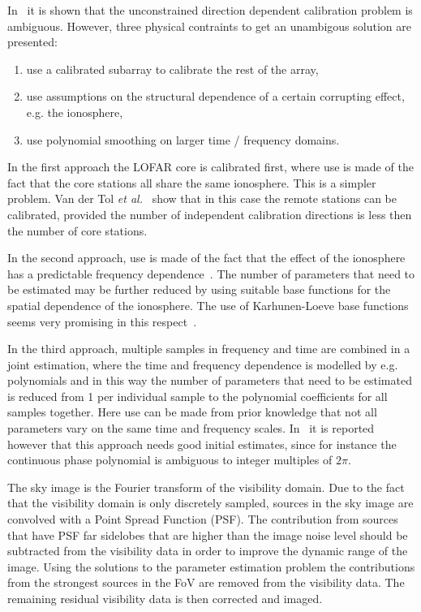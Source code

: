 \documentclass[journal]{IEEEtran}
\begin{document}
In~\cite{Tol:07} it is shown that the unconstrained direction dependent calibration problem is ambiguous. However, three physical contraints to get an unambigous solution are presented: 
%
\begin{enumerate}
\item use a calibrated subarray to calibrate the rest of the array,
\item use assumptions on the structural dependence of a certain corrupting effect, e.g. the ionosphere,
\item use polynomial smoothing on larger time / frequency domains.
\end{enumerate}
% 

In the first approach the LOFAR core is calibrated first, where use is made of the fact that the core stations all share the same ionosphere. This is a simpler problem. Van der Tol {\it et al.}~\cite{Tol:07,Tol:05} show that in this case the remote stations can be calibrated, provided the number of independent calibration directions is less then the number of core stations. 

In the second approach, use is made of the fact that the effect of the ionosphere has a predictable frequency dependence~\cite{Tol:05}. The number of parameters that need to be estimated may be further reduced by using suitable base functions for the spatial dependence of the ionosphere. The use of Karhunen-Loeve base functions seems very promising in this respect~\cite{Tol2:07}.  

In the third approach, multiple samples in frequency and time are combined in a joint estimation, where the time and frequency dependence is modelled by e.g. polynomials and in this way the number of parameters that need to be estimated is reduced from 1 per individual sample to the polynomial coefficients for all samples together. Here use can be made from prior knowledge that not all parameters vary on the same time and frequency scales. In~\cite{Tol:07} it is reported however that this approach needs good initial estimates, since for instance the continuous phase polynomial is ambiguous to integer multiples of $2\pi$.

The sky image is the Fourier transform of the visibility domain. Due to the fact that the visibility domain is only discretely sampled, sources in the sky image are convolved with a Point Spread Function (PSF). The contribution from sources that have PSF far sidelobes that are higher than the image noise level should be subtracted from the visibility data in order to improve the dynamic range of the image. Using the solutions to the parameter estimation problem the contributions from the strongest sources in the FoV are removed from the visibility data. The remaining residual visibility data is then corrected and imaged.
\end{document}
